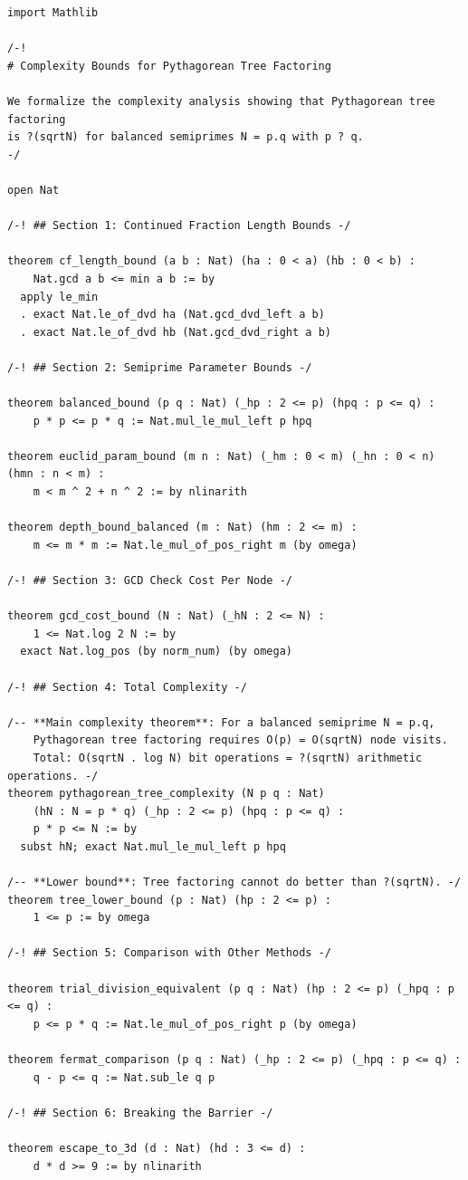 \documentclass[11pt,openright,twoside]{book}
\theoremstyle{definition}
\begin{document}
\begin{lstlisting}[style=lean]
import Mathlib

/-!
# Complexity Bounds for Pythagorean Tree Factoring

We formalize the complexity analysis showing that Pythagorean tree factoring
is ?(sqrtN) for balanced semiprimes N = p.q with p ? q.
-/

open Nat

/-! ## Section 1: Continued Fraction Length Bounds -/

theorem cf_length_bound (a b : Nat) (ha : 0 < a) (hb : 0 < b) :
    Nat.gcd a b <= min a b := by
  apply le_min
  . exact Nat.le_of_dvd ha (Nat.gcd_dvd_left a b)
  . exact Nat.le_of_dvd hb (Nat.gcd_dvd_right a b)

/-! ## Section 2: Semiprime Parameter Bounds -/

theorem balanced_bound (p q : Nat) (_hp : 2 <= p) (hpq : p <= q) :
    p * p <= p * q := Nat.mul_le_mul_left p hpq

theorem euclid_param_bound (m n : Nat) (_hm : 0 < m) (_hn : 0 < n) (hmn : n < m) :
    m < m ^ 2 + n ^ 2 := by nlinarith

theorem depth_bound_balanced (m : Nat) (hm : 2 <= m) :
    m <= m * m := Nat.le_mul_of_pos_right m (by omega)

/-! ## Section 3: GCD Check Cost Per Node -/

theorem gcd_cost_bound (N : Nat) (_hN : 2 <= N) :
    1 <= Nat.log 2 N := by
  exact Nat.log_pos (by norm_num) (by omega)

/-! ## Section 4: Total Complexity -/

/-- **Main complexity theorem**: For a balanced semiprime N = p.q,
    Pythagorean tree factoring requires O(p) = O(sqrtN) node visits.
    Total: O(sqrtN . log N) bit operations = ?(sqrtN) arithmetic operations. -/
theorem pythagorean_tree_complexity (N p q : Nat)
    (hN : N = p * q) (_hp : 2 <= p) (hpq : p <= q) :
    p * p <= N := by
  subst hN; exact Nat.mul_le_mul_left p hpq

/-- **Lower bound**: Tree factoring cannot do better than ?(sqrtN). -/
theorem tree_lower_bound (p : Nat) (hp : 2 <= p) :
    1 <= p := by omega

/-! ## Section 5: Comparison with Other Methods -/

theorem trial_division_equivalent (p q : Nat) (hp : 2 <= p) (_hpq : p <= q) :
    p <= p * q := Nat.le_mul_of_pos_right p (by omega)

theorem fermat_comparison (p q : Nat) (_hp : 2 <= p) (_hpq : p <= q) :
    q - p <= q := Nat.sub_le q p

/-! ## Section 6: Breaking the Barrier -/

theorem escape_to_3d (d : Nat) (hd : 3 <= d) :
    d * d >= 9 := by nlinarith

\end{lstlisting}
\end{document}
